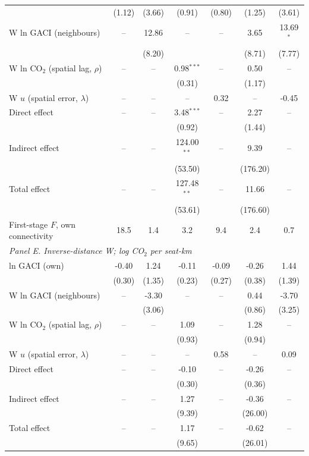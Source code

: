 \documentclass[12pt]{article}
\begin{document}
\begin{table}[H]
{\begin{threeparttable}
\begin{tabular}{lcccccc}
   & (1.12) & (3.66) & (0.91) & (0.80) & (1.25) & (3.61) \\
  W ln GACI (neighbours) & -- & 12.86 & -- & -- & 3.65 & 13.69$^{*}$ \\
   &  & (8.20) &  &  & (8.71) & (7.77) \\
  W ln CO$_2$ (spatial lag, $\rho$) & -- & -- & 0.98$^{***}$ & -- & 0.50 & -- \\
   &  &  & (0.31) &  & (1.17) &  \\
  W $u$ (spatial error, $\lambda$) & -- & -- & -- & 0.32 & -- & -0.45 \\
  Direct effect & -- & -- & 3.48$^{***}$ & -- & 2.27 & -- \\
   &  &  & (0.92) &  & (1.44) &  \\
  Indirect effect & -- & -- & 124.00$^{**}$ & -- & 9.39 & -- \\
   &  &  & (53.50) &  & (176.20) &  \\
  Total effect & -- & -- & 127.48$^{**}$ & -- & 11.66 & -- \\
   &  &  & (53.61) &  & (176.60) &  \\
  First-stage $F$, own connectivity & 18.5 & 1.4 & 3.2 & 9.4 & 2.4 & 0.7 \\
\midrule
\multicolumn{7}{l}{\textit{Panel E. Inverse-distance W; log CO$_2$ per seat-km}} \\
  ln GACI (own) & -0.40 & 1.24 & -0.11 & -0.09 & -0.26 & 1.44 \\
   & (0.30) & (1.35) & (0.23) & (0.27) & (0.38) & (1.39) \\
  W ln GACI (neighbours) & -- & -3.30 & -- & -- & 0.44 & -3.70 \\
   &  & (3.06) &  &  & (0.86) & (3.25) \\
  W ln CO$_2$ (spatial lag, $\rho$) & -- & -- & 1.09 & -- & 1.28 & -- \\
   &  &  & (0.93) &  & (0.94) &  \\
  W $u$ (spatial error, $\lambda$) & -- & -- & -- & 0.58 & -- & 0.09 \\
  Direct effect & -- & -- & -0.10 & -- & -0.26 & -- \\
   &  &  & (0.30) &  & (0.36) &  \\
  Indirect effect & -- & -- & 1.27 & -- & -0.36 & -- \\
   &  &  & (9.39) &  & (26.00) &  \\
  Total effect & -- & -- & 1.17 & -- & -0.62 & -- \\
   &  &  & (9.65) &  & (26.01) &  \\

\end{tabular}
\end{threeparttable}}
\end{table}
\end{document}
